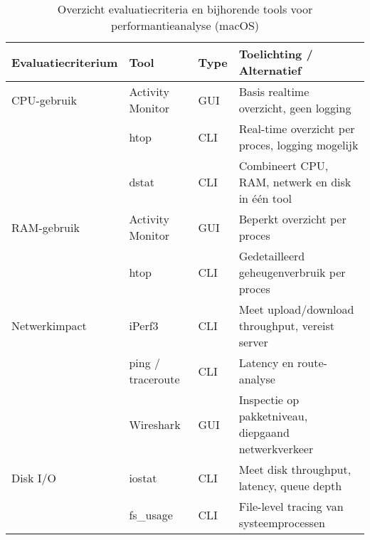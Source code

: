 \begin{table}[h]
    \centering
    \small
    \begin{tabular}{
        >{\raggedright\arraybackslash}p{3.5cm} 
        >{\raggedright\arraybackslash}p{4cm} 
        >{\raggedright\arraybackslash}p{2.5cm} 
        >{\raggedright\arraybackslash}p{4cm}
    }
        \toprule
        \textbf{Evaluatiecriterium} & \textbf{Tool} & \textbf{Type} & \textbf{Toelichting / Alternatief} \\ 
        \midrule
        CPU-gebruik & Activity Monitor & GUI & Basis realtime overzicht, geen logging \\
                    & htop & CLI & Real-time overzicht per proces, logging mogelijk \\
                    & dstat & CLI & Combineert CPU, RAM, netwerk en disk in één tool \\
        \midrule
        RAM-gebruik & Activity Monitor & GUI & Beperkt overzicht per proces \\
                    & htop & CLI & Gedetailleerd geheugenverbruik per proces \\
        \midrule
        Netwerkimpact & iPerf3 & CLI & Meet upload/download throughput, vereist server \\
                      & ping / traceroute & CLI & Latency en route-analyse \\
                      & Wireshark & GUI & Inspectie op pakketniveau, diepgaand netwerkverkeer \\
        \midrule
        Disk I/O & iostat & CLI & Meet disk throughput, latency, queue depth \\
                 & fs\_usage & CLI & File-level tracing van systeemprocessen \\
        \bottomrule
    \end{tabular}
    \caption{Overzicht evaluatiecriteria en bijhorende tools voor performantieanalyse (macOS)}
    \label{tab:eval-criteria-performance}
\end{table}



